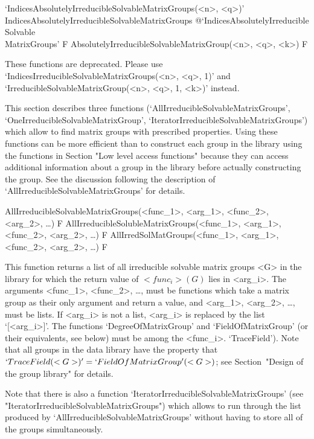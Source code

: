 \>`IndicesAbsolutelyIrreducibleSolvableMatrixGroups(<n>, <q>)'%
{IndicesAbsolutelyIrreducibleSolvableMatrixGroups}%
@{`IndicesAbsolutelyIrreducible\\Solvable\\MatrixGroups'} F
\>AbsolutelyIrreducibleSolvableMatrixGroup(<n>, <q>,  <k>) F

These functions are deprecated.  Please use `IndicesIrreducibleSolvableMatrixGroups(<n>, <q>, 1)' and `IrreducibleSolvableMatrixGroup(<n>, <q>, 1, <k>)' instead.



This section describes three functions
(`AllIrreducibleSolvableMatrixGroups',
`OneIrreducibleSolvableMatrixGroup',
`IteratorIrreducibleSolvableMatrixGroups') which allow to find matrix
groups with prescribed properties. Using these functions can be more efficient
than to construct each group in the library using the functions in Section
"Low level access functions" because they can access additional information 
about a group in the {\IRREDSOL} library before actually constructing the group. 
See the discussion following the description of 
`AllIrreducibleSolvableMatrixGroups' for details. 

\>AllIrreducibleSolvableMatrixGroups(<func_1>, <arg_1>, <func_2>, <arg_2>, \dots) F
\>AllIrreducibleSolubleMatrixGroups(<func_1>, <arg_1>, <func_2>, <arg_2>, \dots) F
\>AllIrredSolMatGroups(<func_1>, <arg_1>, <func_2>, <arg_2>, \dots) F

This function returns a list of all irreducible solvable matrix
groups <G> in the {\IRREDSOL} library for which the return value of $<func_i>(G)$ lies in
<arg_i>.  The arguments <func_1>, <func_2>, \dots,
must be {\GAP} functions which take a matrix group as their only argument and
return a value, and <arg_1>, <arg_2>,
\dots,  must be lists. If <arg_i> is not a list, <arg_i> is replaced by the list
`[<arg_i>]'. The functions `DegreeOfMatrixGroup' and `FieldOfMatrixGroup' (or their equivalents, see below) must be among the <func_i>. 
`TraceField'). Note that all groups in the data library have the property that 
$`TraceField(<G>)' = `FieldOfMatrixGroup'(<G>)$; see Section~"Design of the group library" 
for details. 

Note that there is also a function `IteratorIrreducibleSolvableMatrixGroups' (see
"IteratorIrreducibleSolvableMatrixGroups") which allows to run through the list produced by
`AllIrreducibleSolvableMatrixGroups' without having to store all of the groups
simultaneously.

